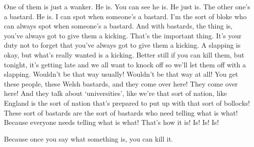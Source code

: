One of them is just a wanker.  He is.  You can see he is.  He just is.
The other one’s a bastard.  He is.  I can spot when someone’s a
bastard. I’m the sort of bloke who can always spot when someone’s a
bastard.  And with bastards, the thing is, you’ve always got to give
them a kicking.  That’s the important thing.  It’s your duty not to %
forget that you’ve always got to give them a kicking.  A slapping is
okay, but what’s really wanted is a kicking.  Better still if %
you can kill them, but tonight, it’s getting late and we all want to
knock off so we’ll let them off with a slapping.  Wouldn’t be that way
usually!  Wouldn’t be that way at all!  You get these people, these
Welsh bastards, and they come over here!  They come over here!  And
they talk about ‘universities’, like we’re that sort of nation, like
England is the sort of nation that’s prepared to put up with that sort
of bollocks!  These sort of bastards are the sort of bastards who need
telling what is what!  Because everyone needs telling what is what!
That’s how it is!  Is!  Is!  Is!

Because once you say what something is, you can kill it.
